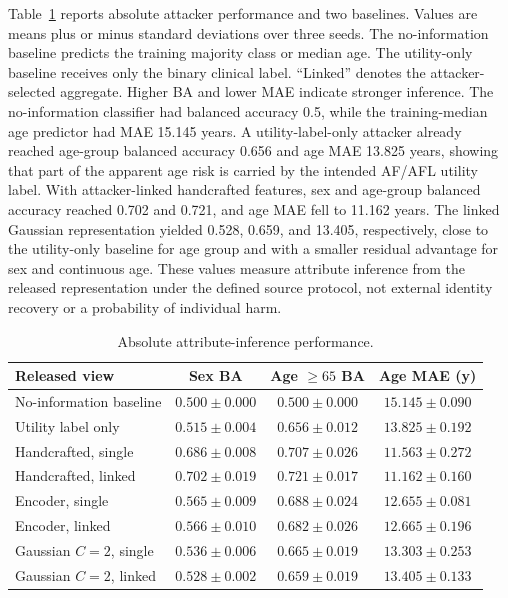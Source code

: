 \documentclass[journal]{IEEEtran}
\begin{document}
Table~\ref{tab:absolute-attribute} reports absolute attacker performance and
two baselines. Values are means plus or minus standard deviations over three
seeds. The no-information baseline predicts the training majority class or
median age. The utility-only baseline receives only the binary clinical label.
``Linked'' denotes the attacker-selected aggregate. Higher BA and lower MAE
indicate stronger inference. The no-information classifier had balanced
accuracy 0.5, while
the training-median age predictor had MAE 15.145 years. A utility-label-only
attacker already reached age-group balanced accuracy 0.656 and age MAE 13.825
years, showing that part of the apparent age risk is carried by the intended
AF/AFL utility label. With attacker-linked handcrafted features, sex and age-group
balanced accuracy reached 0.702 and 0.721, and age MAE fell to 11.162 years.
The linked Gaussian representation yielded 0.528, 0.659, and 13.405,
respectively, close to the utility-only baseline for age group and with a
smaller residual advantage for sex and continuous age. These values measure
attribute inference from the released representation under the defined source
protocol, not external identity recovery or a probability of individual harm.

\begin{table}[ht]
\centering
\scriptsize
\setlength{\tabcolsep}{2.8pt}
\caption{Absolute attribute-inference performance.}
\label{tab:absolute-attribute}
\begin{tabular}{lccc}
\toprule
Released view & Sex BA & Age $\geq65$ BA & Age MAE (y) \\
\midrule
No-information baseline & $0.500\mathbin{\pm}0.000$ & $0.500\mathbin{\pm}0.000$ & $15.145\mathbin{\pm}0.090$ \\
Utility label only & $0.515\mathbin{\pm}0.004$ & $0.656\mathbin{\pm}0.012$ & $13.825\mathbin{\pm}0.192$ \\
\midrule
Handcrafted, single & $0.686\mathbin{\pm}0.008$ & $0.707\mathbin{\pm}0.026$ & $11.563\mathbin{\pm}0.272$ \\
Handcrafted, linked & $0.702\mathbin{\pm}0.019$ & $0.721\mathbin{\pm}0.017$ & $11.162\mathbin{\pm}0.160$ \\
Encoder, single & $0.565\mathbin{\pm}0.009$ & $0.688\mathbin{\pm}0.024$ & $12.655\mathbin{\pm}0.081$ \\
Encoder, linked & $0.566\mathbin{\pm}0.010$ & $0.682\mathbin{\pm}0.026$ & $12.665\mathbin{\pm}0.196$ \\
Gaussian $C=2$, single & $0.536\mathbin{\pm}0.006$ & $0.665\mathbin{\pm}0.019$ & $13.303\mathbin{\pm}0.253$ \\
Gaussian $C=2$, linked & $0.528\mathbin{\pm}0.002$ & $0.659\mathbin{\pm}0.019$ & $13.405\mathbin{\pm}0.133$ \\
\bottomrule
\end{tabular}
\end{table}
\end{document}

